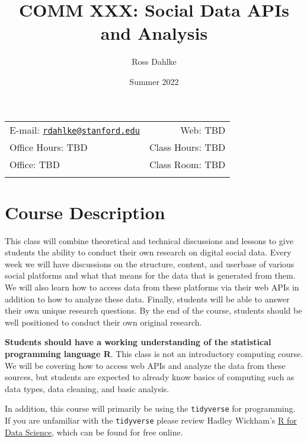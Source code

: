 \documentclass[11pt,]{article}
\title{COMM XXX: Social Data APIs and Analysis}
\author{Ross Dahlke}
\date{Summer 2022}
\begin{document}
  

		\maketitle
		
	
		\thispagestyle{firststyle}



	\noindent \begin{tabular*}{\textwidth}{ @{\extracolsep{\fill}} lr @{\extracolsep{\fill}}}


E-mail: \texttt{\href{mailto:rdahlke@stanford.edu}{\nolinkurl{rdahlke@stanford.edu}}} & Web: TBD\\
Office Hours: TBD  &  Class Hours: TBD\\
Office: TBD  & Class Room: TBD\\
	&  \\
	\hline
	\end{tabular*}
	
\vspace{2mm}
	


\hypertarget{course-description}{%
\section{Course Description}\label{course-description}}

This class will combine theoretical and technical discussions and
lessons to give students the ability to conduct their own research on
digital social data. Every week we will have discussions on the
structure, content, and userbase of various social platforms and what
that means for the data that is generated from them. We will also learn
how to access data from these platforms via their web APIs in addition
to how to analyze these data. Finally, students will be able to answer
their own unique research questions. By the end of the course, students
should be well positioned to conduct their own original research.

\textbf{Students should have a working understanding of the statistical
programming language R}. This class is not an introductory computing
course. We will be covering how to access web APIs and analyze the data
from these sources, but students are expected to already know basics of
computing such as data types, data cleaning, and basic analysis.

In addition, this course will primarily be using the \texttt{tidyverse}
for programming. If you are unfamiliar with the \texttt{tidyverse}
please review Hadley Wickham's \href{https://r4ds.had.co.nz/}{R for Data
Science}, which can be found for free online.
\end{document}
